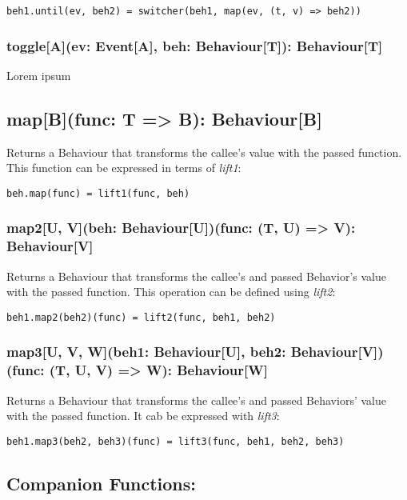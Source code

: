 \begin{verbatim}
beh1.until(ev, beh2) = switcher(beh1, map(ev, (t, v) => beh2))
\end{verbatim}      
      
    \subsubsection*{toggle[A](ev: Event[A], beh: Behaviour[T]): Behaviour[T]}
      Lorem ipsum
      
    \subsection*{map[B](func: T => B): Behaviour[B]}
      Returns a Behaviour that transforms the callee's
      value with the passed function.
      This function can be expressed in terms of \emph{lift1}:

\begin{verbatim}
beh.map(func) = lift1(func, beh)
\end{verbatim}      
      
    \subsubsection*{map2[U, V](beh: Behaviour[U])(func: (T, U) => V): Behaviour[V]}
      Returns a Behaviour that transforms the callee's
      and passed Behavior's value with the passed function. This operation
      can be defined using \emph{lift2}:

\begin{verbatim}
beh1.map2(beh2)(func) = lift2(func, beh1, beh2)
\end{verbatim}      

    \subsubsection*{map3[U, V, W](beh1: Behaviour[U], beh2: Behaviour[V])(func: (T, U, V) => W): Behaviour[W]}
      Returns a Behaviour that transforms the callee's
      and passed Behaviors' value with the passed function. It cab
      be expressed with \emph{lift3}:

\begin{verbatim}
beh1.map3(beh2, beh3)(func) = lift3(func, beh1, beh2, beh3)
\end{verbatim}    

    \subsection*{Companion Functions:}
